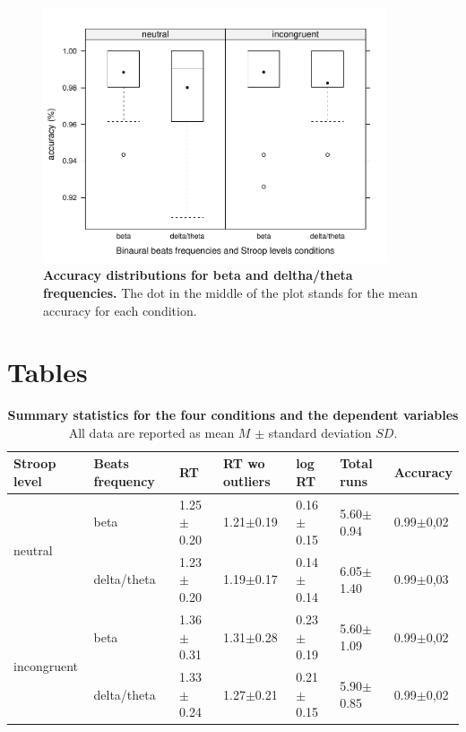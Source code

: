 \documentclass[10pt]{article}
\begin{document}
\begin{figure}[H]
\begin{center}
\includegraphics[width=4in]{accuracy-eps-converted-to.pdf}
\end{center}
\caption{
{\bf Accuracy distributions for beta and deltha/theta frequencies.}
The dot in the middle of the plot stands for the mean accuracy for each condition.
}
\label{figure_accuracy}
\end{figure}

\section*{Tables}

\begin{table}[!ht]
\caption{
{\bf Summary statistics for the four conditions and the dependent variables}
All data are reported as mean \(M\) $\pm$ standard deviation \(SD\).
}
\label{tab:summary}
    \begin{tabular}{|l|l|l|l|l|l|l|}
    \hline
    Stroop level & Beats frequency & RT & RT wo outliers & log RT & Total runs & Accuracy \\
    \hline
    \multirow{2}{*}{neutral} & beta & 1.25$\pm$0.20 & 1.21$\pm$0.19 & 0.16$\pm$0.15 & 5.60$\pm$0.94 & 0.99$\pm$0,02 \\
    & delta/theta & 1.23$\pm$0.20 & 1.19$\pm$0.17 & 0.14$\pm$0.14 & 6.05$\pm$1.40  & 0.99$\pm$0,03 \\
    \hline
    \multirow{2}{*}{incongruent} & beta & 1.36$\pm$0.31 & 1.31$\pm$0.28 & 0.23$\pm$0.19 & 5.60$\pm$1.09  & 0.99$\pm$0,02 \\
    & delta/theta & 1.33$\pm$0.24 & 1.27$\pm$0.21 & 0.21$\pm$0.15 & 5.90$\pm$0.85  & 0.99$\pm$0,02 \\
    \hline
    \end{tabular}
\end{table}
\end{document}
